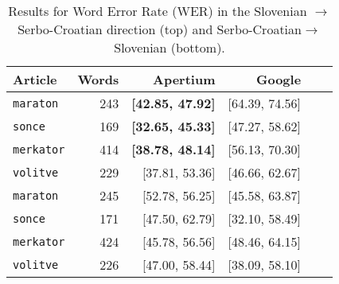 

\begin{table}
\begin{center}
\begin{tabular}{|l|r|r|r|r|r|}
   \hline
   Article      & Words &  Apertium & Google \\
   \hline
   \hline
  \texttt{maraton}  & 243            & \textbf{[42.85, 47.92]} & [64.39, 74.56] \\
  \texttt{sonce}    & 169            & \textbf{[32.65, 45.33]}    & [47.27, 58.62] \\
  \texttt{merkator} & 414            & \textbf{[38.78, 48.14]}     & [56.13, 70.30] \\
  \texttt{volitve}  & 229            & [37.81, 53.36]      & [46.66, 62.67] \\
  \hline
  \hline
  \texttt{maraton}  & 245            & [52.78, 56.25]           & [45.58, 63.87]\\
  \texttt{sonce}    & 171            & [47.50, 62.79]    & [32.10, 58.49] \\
  \texttt{merkator} & 424            & [45.78, 56.56]    & [48.46, 64.15] \\
  \texttt{volitve}  & 226            & [47.00, 58.44]    & [38.09, 58.10]\\

  \hline
\end{tabular}
 \caption{Results for Word Error Rate (WER) in the Slovenian $\rightarrow $Serbo-Croatian direction (top) and Serbo-Croatian$\rightarrow$Slovenian (bottom). }
\label{table:quantitative1}
\end{center}
\end{table}


